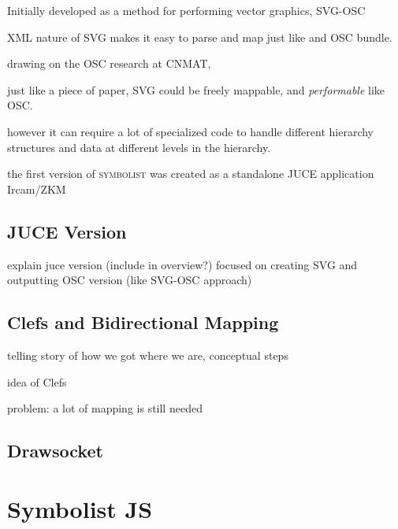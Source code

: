 \documentclass{article}
\def\symbolist{\textsc{symbolist}\xspace}
\begin{document}
Initially developed as a method for performing vector graphics, 
SVG-OSC  \cite{gottfried2015svg}

\cite{maccallum2015dynamic} %


XML nature of SVG makes it easy to parse and map just like and OSC bundle.

drawing on the OSC research at CNMAT, 

just like a piece of paper, SVG could be freely mappable, and \textit{performable} like OSC.



however it can require a lot of specialized code to handle different hierarchy structures and data at different levels in the hierarchy.


the first version of \symbolist was created as a standalone JUCE application
Ircam/ZKM~\cite{gottfried2018symbolist}

\subsection{JUCE Version}\label{sec:juce_version}

explain juce version (include in overview?)
focused on creating SVG and outputting OSC version (like SVG-OSC approach)


\subsection{Clefs and Bidirectional Mapping}\label{sec:bidirectional_mapping}

telling story of how we got where we are, conceptual steps

idea of Clefs

problem:
a lot of mapping is still needed

\subsection{Drawsocket}\label{sec:drawsocket}

\cite{gottfried2019drawsocket}
\cite{hajdu2005quintet}



\section{Symbolist JS}\label{sec:symbolist_js}
\end{document}
